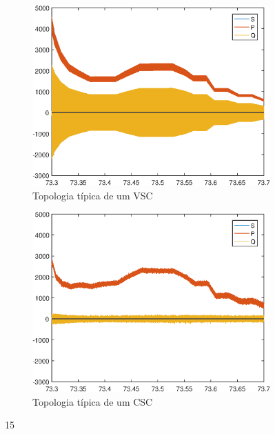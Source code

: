 \begin{figure}[!htb] %
	\centering
	\begin{subfigure}[b]{0.48\textwidth}
		\centering
		\includegraphics[width=\textwidth]{Cap4/Figuras/resultados_unfilt_15.eps}
		\caption{Topologia típica de um VSC} 
		\label{fig:resultados_unfilt_15.eps}
	\end{subfigure}%
		\hfill
	\begin{subfigure}[b]{0.48\textwidth}  
		\centering 
		\includegraphics[width=\textwidth]{Cap4/Figuras/resultados_filt_15.eps}
		\caption{Topologia típica de um CSC}    
		\label{fig:resultados_filt_15.eps}
	\end{subfigure}%
	\caption{15}
	\label{fig:15}
\end{figure}

